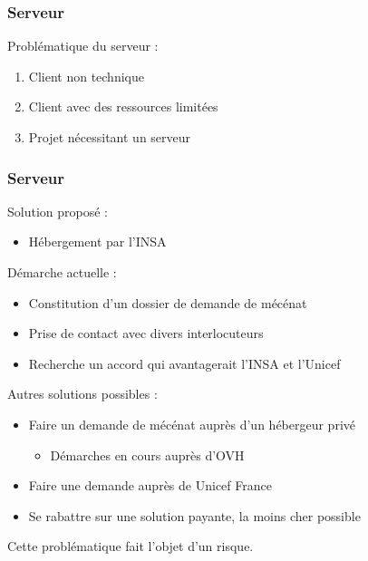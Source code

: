 \begin{frame}
	\frametitle{Serveur}

    Problématique du serveur :
      \begin{enumerate}
        \item Client non technique
        \item Client avec des ressources limitées
        \item Projet nécessitant un serveur
      \end{enumerate}
      
\end{frame}


\begin{frame}
	\frametitle{Serveur}
	Solution proposé :
	\begin{itemize}	
    \item Hébergement par l'INSA
    \end{itemize}
    Démarche actuelle :
      \begin{itemize}
        \item Constitution d'un dossier de demande de mécénat
        \item Prise de contact avec divers interlocuteurs
        \item Recherche un accord qui avantagerait l'INSA et l'Unicef
      \end{itemize}
    Autres solutions possibles :
      \begin{itemize}
        \item Faire un demande de mécénat auprès d'un hébergeur privé
		\begin{itemize}
			\item Démarches en cours auprès d'OVH        
        \end{itemize}
        \item Faire une demande auprès de Unicef France
        \item Se rabattre sur une solution payante, la moins cher possible
      \end{itemize}
    \begin{center}
    \begin{tiny}
    Cette problématique fait l'objet d'un risque.
    \end{tiny}
    \end{center}
\end{frame}